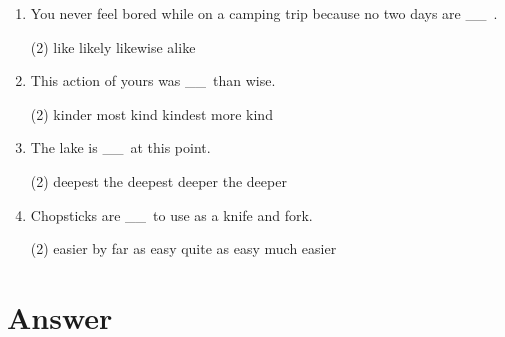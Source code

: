 \documentclass{yufa}
\newcommand\ttu{ \_\_\ }
\begin{document}
\begin{enumerate}
\item You never feel bored while on a camping trip because no two days are \ttu.
  \begin{tasks}(2)
    \task like
    \task likely
    \task likewise
    \task alike
  \end{tasks}

\item This action of yours was \ttu than wise.
  \begin{tasks}(2)
    \task kinder
    \task most kind
    \task kindest
    \task more kind
  \end{tasks}

\item The lake is \ttu at this point.
  \begin{tasks}(2)
    \task deepest
    \task the deepest
    \task deeper
    \task the deeper
  \end{tasks}

\item Chopsticks are \ttu to use as a knife and fork.
  \begin{tasks}(2)
    \task easier
    \task by far as easy
    \task quite as easy
    \task much easier
  \end{tasks}

\end{enumerate}

\section{Answer}
\end{document}
